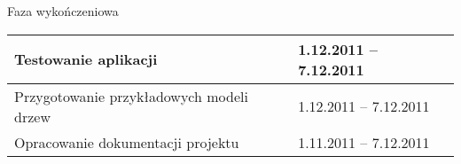     Faza wykończeniowa
    \begin{longtable}{|p{85mm}|p{42mm}|} \hline
    Testowanie aplikacji
    & 1.12.2011 -- 7.12.2011
    \\ \hline

    Przygotowanie przykładowych modeli drzew
    & 1.12.2011 -- 7.12.2011
    \\ \hline
	
    Opracowanie dokumentacji projektu
    & 1.11.2011 -- 7.12.2011
    \\ \hline
	
    \end{longtable}
